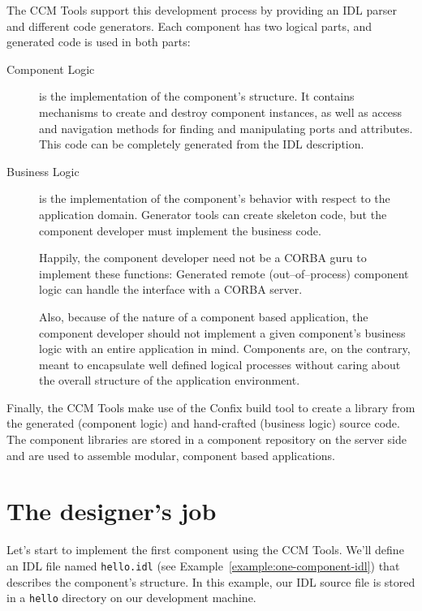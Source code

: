 The CCM Tools support this development process by providing an IDL parser and
different code generators. Each component has two logical parts, and generated
code is used in both parts:
\begin{description}
\item [Component Logic]
is the implementation of the component's structure. It contains mechanisms to
create and destroy component instances, as well as access and navigation methods
for finding and manipulating ports and attributes. This code can be completely
generated from the IDL description.

\item [Business Logic]
is the implementation of the component's behavior with respect to the
application domain. Generator tools can create skeleton code, but the component
developer must implement the business code.

Happily, the component developer need not be a CORBA guru to implement these
functions: Generated remote (out--of--process) component logic can handle the
interface with a CORBA server.

Also, because of the nature of a component based application, the component
developer should not implement a given component's business logic with an entire
application in mind. Components are, on the contrary, meant to encapsulate well
defined logical processes without caring about the overall structure of the
application environment.
\end{description}

Finally, the CCM Tools make use of the Confix build tool to create a library
from the generated (component logic) and hand-crafted (business logic) source
code. The component libraries are stored in a component repository on the server
side and are used to assemble modular, component based applications.

\section{The designer's job}

Let's start to implement the first component using the CCM Tools. We'll define
an IDL file named {\tt hello.idl} (see Example~\ref{example:one-component-idl})
that describes the component's structure. In this example, our IDL source file
is stored in a {\tt hello} directory on our development machine.

